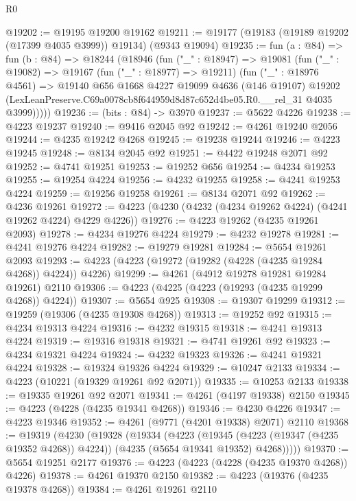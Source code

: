 \begin{lexlean}{R0}
\begin{coremodule}
@19202 := @19195 @19200 @19162
@19211 := @19177 (@19183 (@19189 @19202 (@17399 @4035 @3999)) @19134) (@9343 @19094)
@19235 := fun (a : @84) =>
  fun (b : @84) =>
  @18244
    (@18946
      (fun ("_" : @18947) =>
      @19081
        (fun ("_" : @19082) =>
        @19167
          (fun ("_" : @18977) => @19211)
          (fun ("_" : @18976 @4561) =>
          @19140
            @656
            @1668
            @4227
            @19099
            @4636
            (@146 @19107)
            @19202
            (LexLeanPreserve.C69a0078cb8f644959d8d87c652d4be05.R0.__rel_31 @4035 @3999)))))
@19236 := (bits : @84) -> @3970
@19237 := @5622 @4226
@19238 := @4223 @19237
@19240 := @9416 @2045 @92
@19242 := @4261 @19240 @2056
@19244 := @4235 @19242 @4268
@19245 := @19238 @19244
@19246 := @4223 @19245
@19248 := @8134 @2045 @92
@19251 := @4422 @19248 @2071 @92
@19252 := @4741 @19251
@19253 := @19252 @656
@19254 := @4234 @19253
@19255 := @19254 @4224
@19256 := @4232 @19255
@19258 := @4241 @19253 @4224
@19259 := @19256 @19258
@19261 := @8134 @2071 @92
@19262 := @4236 @19261
@19272 := @4223 (@4230 (@4232 (@4234 @19262 @4224) (@4241 @19262 @4224) @4229 @4226))
@19276 := @4223 @19262 (@4235 @19261 @2093)
@19278 := @4234 @19276 @4224
@19279 := @4232 @19278
@19281 := @4241 @19276 @4224
@19282 := @19279 @19281
@19284 := @5654 @19261 @2093
@19293 := @4223 (@4223 (@19272 (@19282 (@4228 (@4235 @19284 @4268)) @4224)) @4226)
@19299 := @4261 (@4912 @19278 @19281 @19284 @19261) @2110
@19306 := @4223 (@4225 (@4223 (@19293 (@4235 @19299 @4268)) @4224))
@19307 := @5654 @925
@19308 := @19307 @19299
@19312 := @19259 (@19306 (@4235 @19308 @4268))
@19313 := @19252 @92
@19315 := @4234 @19313 @4224
@19316 := @4232 @19315
@19318 := @4241 @19313 @4224
@19319 := @19316 @19318
@19321 := @4741 @19261 @92
@19323 := @4234 @19321 @4224
@19324 := @4232 @19323
@19326 := @4241 @19321 @4224
@19328 := @19324 @19326 @4224
@19329 := @10247 @2133
@19334 := @4223 (@10221 (@19329 @19261 @92 @2071))
@19335 := @10253 @2133
@19338 := @19335 @19261 @92 @2071
@19341 := @4261 (@4197 @19338) @2150
@19345 := @4223 (@4228 (@4235 @19341 @4268))
@19346 := @4230 @4226
@19347 := @4223 @19346
@19352 := @4261 (@9771 (@4201 @19338) @2071) @2110
@19368 := @19319
    (@4230
      (@19328
        (@19334
          (@4223
            (@19345 (@4223 (@19347 (@4235 @19352 @4268)) @4224))
            (@4235 (@5654 @19341 @19352) @4268)))))
@19370 := @5654 @19251 @2177
@19376 := @4223 (@4223 (@4228 (@4235 @19370 @4268)) @4226)
@19378 := @4261 @19370 @2150
@19382 := @4223 (@19376 (@4235 @19378 @4268))
@19384 := @4261 @19261 @2110

\end{coremodule}
\end{lexlean}
